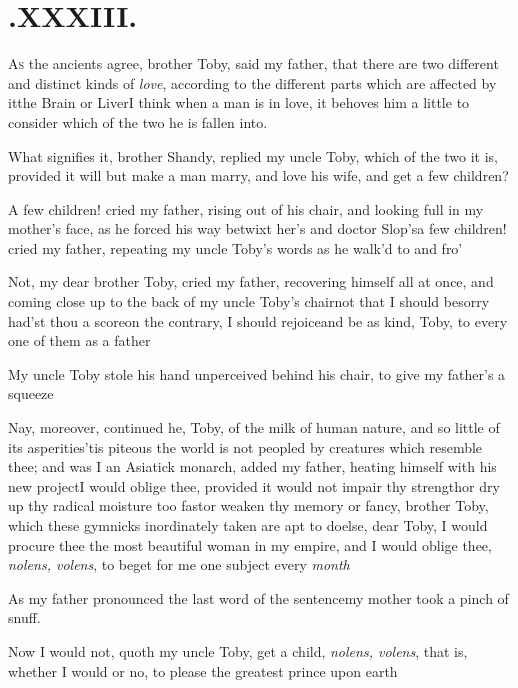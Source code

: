 \documentclass{article}
\begin{document}
\vfill{}\eject\null
\section{.\enspace XXXIII.}

\lettrine{A}{s} the ancients agree, brother Toby, said my father, that there are two
different and distinct kinds of \textit{love}, according to the different parts
which are affected by it\tsk the Brain or Liver\tsh I think when a man is in love, it
behoves him a little to consider which of the two he is fallen into.

What signifies it, brother Shandy, replied my uncle
Toby, which of the two it is, provided it will but make a
man marry, and love his wife, and get a few children?

\tsh A few children! cried my father, rising out of his
chair, and looking full in my mother’s face, as he forced his
way betwixt her’s and doctor Slop’s\tsk a few children! cried my father, repeating my uncle
Toby’s words as he walk’d to and
fro’\tsh

\tsh Not, my dear brother Toby, cried my father, recovering
himself all at once, and coming close up to the back of my uncle
Toby’s chair\tsk not that I should be\break sorry had’st thou a
score\tsk on the contrary, I should rejoice\tsk and be as kind,
Toby, to every one of them as a father\tsk 

My uncle Toby stole his hand unperceived behind his
chair, to give my father’s a squeeze\tsh

\tsh Nay, moreover, continued he,\break
{}
Toby, of the milk of human nature, and so little of
its asperities\tsk ’tis piteous the world is not peopled by creatures which resemble
thee; and was I an Asia\-tick monarch, added my father, heating himself with his new
project\tsk I would oblige thee, provided it would not impair thy strength\tsk or dry up
thy radical moisture too fast\tsk or weaken thy memory or fancy, brother Toby, which
these gymnicks inordinately taken are apt to do\tsk else, dear Toby, I would procure
thee the most beautiful woman in my empire, and I would oblige thee, \textit{nolens,
volens}, to beget for me one subject every \textit{month}\tsh

As my father pronounced the last word of the sentence\tsk my
mother took a pinch of snuff.

Now I would not, quoth my uncle Toby, get a child,
\textit{nolens, volens}, that is, whether I would or no, to please
the greatest prince upon earth\tsh
\end{document}
